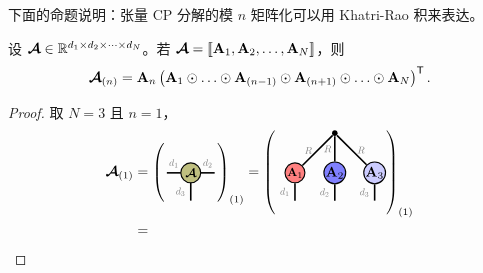 下面的命题说明：张量 CP 分解的模 $n$ 矩阵化可以用 Khatri-Rao 积来表达。
\begin{proposition}
设 $\bm{\mathcal{A}}\in\mathbb{R}^{d_1\times d_2\times\dots\times d_N}$。若 $\bm{\mathcal{A}}=\llbracket \mathbf{A}_1,\mathbf{A}_2,\dots,\mathbf{A}_N \rrbracket$，则
$$\At_{(n)}=\Ab_n\left(\Ab_1\krao\dots\krao\Ab_{(n-1)}\krao\Ab_{(n+1)}\krao\dots\krao\Ab_N\right)^\ts.$$
\begin{proof}
取 $N=3$ 且 $n=1$，
\begin{align*}
\At_{(1)}
&=
\left(\begin{tikzpicture}[baseline=\baseline]
    \tikzset{tensor/.style = {minimum size = 0.5cm,shape = circle,thick,draw=black,inner sep = 0pt}, edge/.style  = {thick,line width=.4mm},every loop/.style={}}
    \def\y{0}
    \def\x{0}
    \node[tensor,fill=green!50!red!50!white] (At) at (\x,\y){\scalebox{0.85}{$\At$}};
    \draw[edge] (\x+0.25,\y) -- (\x+0.6,\y)  node [midway,above] {\scalebox{0.7}{\dimcolor{$d_2$}}};
    \draw[edge] (\x-0.25,\y) -- (\x-0.6,\y)  node [midway,above] {\scalebox{0.7}{\dimcolor{$d_1$}}};
    \draw[edge] (\x,\y-0.25) -- (\x,\y-0.7)  node [midway,left] {\scalebox{0.7}{\dimcolor{$d_3$}}};
    \end{tikzpicture}\right)_{(1)}
=
\left(\begin{tikzpicture}[baseline=\baseline]
    \tikzset{tensor/.style = {minimum size = 0.5cm,shape = circle,thick,draw=black,inner sep = 0pt}, edge/.style   = {thick,line width=.4mm},every loop/.style={}}
    \def\y{0}
    \def\x{0}
  \node[tensor,fill=red!50!white] (A1) at (\x,\y){\scalebox{0.85}{$\Ab_1$}};
  \node[tensor,fill=blue!50!white] (A2) at (\x+1,\y){$\Ab_2$};
   \node[tensor,fill=blue!20!white] (A3) at (\x+2,\y){$\Ab_3$};
    \draw  node[fill = black,circle,inner sep=0pt,minimum size=4pt] (m) at (\x+1,\y+1) {};
    \draw[edge] (A1) -- (m) node [midway,left] {\scalebox{0.7}{\dimcolor{$R$}}};
    \draw[edge] (A2) -- (m)node [midway,left=-0.05cm] {\scalebox{0.7}{\dimcolor{$R$}}};
    \draw[edge] (A3) -- (m)node [midway,right] {\scalebox{0.7}{\dimcolor{$R$}}};
    \draw[edge](A1) -- (\x,\y-0.7)node [midway,left] {\edgelabel{$d_1$}};
    \draw[edge](A2) -- (\x+1,\y-0.7)node [midway,left] {\edgelabel{$d_2$}};
    \draw[edge](A3) -- (\x+2,\y-0.7)node [midway,left] {\edgelabel{$d_3$}};
\end{tikzpicture}\right)_{(1)}\\
&=
\begin{tikzpicture}[baseline=\baseline]
    \tikzset{tensor/.style = {minimum size = 0.5cm,shape = circle,thick,draw=black,inner sep = 0pt}, edge/.style   = {thick,line width=.4mm},every loop/.style={}}

\end{tikzpicture}
\end{align*}
\end{proof}
\end{proposition}
